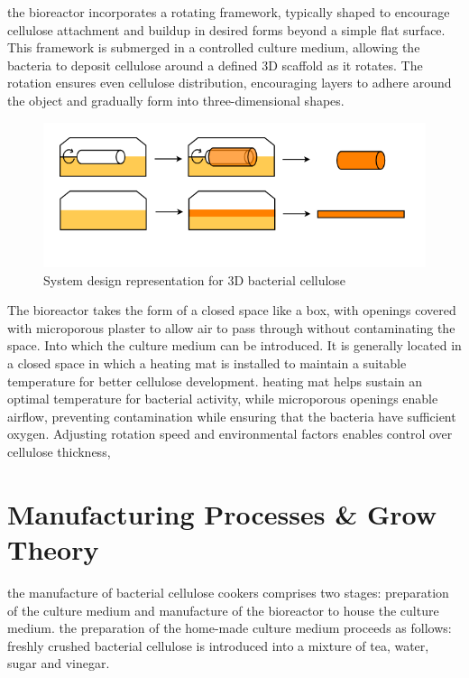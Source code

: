 the bioreactor incorporates a rotating framework, typically shaped to encourage cellulose attachment and buildup in desired forms beyond a simple flat surface. This framework is submerged in a controlled culture medium, allowing the bacteria to deposit cellulose around a defined 3D scaffold as it rotates. The rotation ensures even cellulose distribution, encouraging layers to adhere around the object and gradually form into three-dimensional shapes.
\begin{figure}[h]
    \centering
    \includegraphics{images/shema3Dscoby.png}
    \caption{System design representation for 3D bacterial cellulose}
    \label{fig:diagBC3D}
\end{figure} 

The bioreactor takes the form of a closed space like a box, with openings covered with microporous plaster to allow air to pass through without contaminating the space. Into which the culture medium can be introduced.
It is generally located in a closed space in which a heating mat is installed to maintain a suitable temperature for better cellulose development. 
heating mat helps sustain an optimal temperature for bacterial activity, while microporous openings enable airflow, preventing contamination while ensuring that the bacteria have sufficient oxygen. Adjusting rotation speed and environmental factors enables control over cellulose thickness,


\section{Manufacturing Processes \& Grow Theory}

the manufacture of bacterial cellulose cookers comprises two stages: preparation of the culture medium and manufacture of the bioreactor to house the culture medium. 
the preparation of the home-made culture medium proceeds as follows:
freshly crushed bacterial cellulose is introduced into a mixture of tea, water, sugar and vinegar. 


